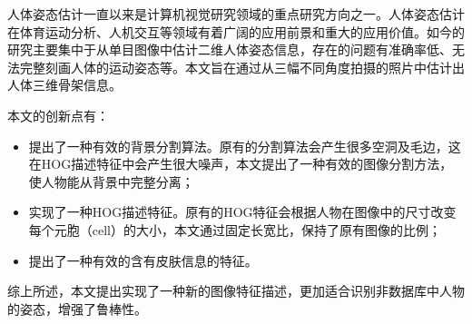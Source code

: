 
 

\makeatletter
\ifthu@bachelor\relax\else
  \ifthu@doctor
  \else
    \ifthu@master
    \fi
  \fi
\fi
\makeatother





\begin{cabstract}

人体姿态估计一直以来是计算机视觉研究领域的重点研究方向之一。人体姿态估计在体育运动分析、人机交互等领域有着广阔的应用前景和重大的应用价值。如今的研究主要集中于从单目图像中估计二维人体姿态信息，存在的问题有准确率低、无法完整刻画人体的运动姿态等。本文旨在通过从三幅不同角度拍摄的照片中估计出人体三维骨架信息。

本文的创新点有：
  \begin{itemize}
    \item 提出了一种有效的背景分割算法。原有的分割算法会产生很多空洞及毛边，这在HOG描述特征中会产生很大噪声，本文提出了一种有效的图像分割方法，使人物能从背景中完整分离；
    \item 实现了一种HOG描述特征。原有的HOG特征会根据人物在图像中的尺寸改变每个元胞（cell）的大小，本文通过固定长宽比，保持了原有图像的比例；
    \item 提出了一种有效的含有皮肤信息的特征。
  \end{itemize}

综上所述，本文提出实现了一种新的图像特征描述，更加适合识别非数据库中人物的姿态，增强了鲁棒性。

\end{cabstract}

